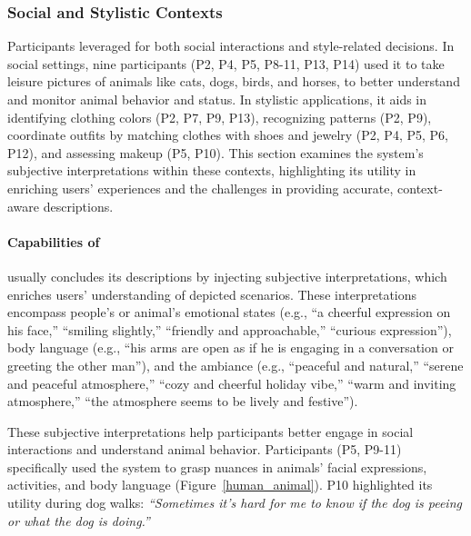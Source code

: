 \subsubsection{Social and Stylistic Contexts}
\label{social_stylistic}


Participants leveraged \sbma{} for both social interactions and style-related decisions. 
In social settings, nine participants (P2, P4, P5, P8-11, P13, P14) used it to take leisure pictures of animals like cats, dogs, birds, and horses, to better understand and monitor animal behavior and status. 
% 
In stylistic applications, it aids in identifying clothing colors (P2, P7, P9, P13), recognizing patterns (P2, P9), coordinate outfits by matching clothes with shoes and jewelry (P2, P4, P5, P6, P12), and assessing makeup (P5, P10).
% 
This section examines the system's subjective interpretations within these contexts, highlighting its utility in enriching users’ experiences and the challenges in providing accurate, context-aware descriptions.





\paragraph{Capabilities of \bma}

\sbma{} usually concludes its descriptions by injecting subjective interpretations, which enriches users' understanding of depicted scenarios. 
These interpretations encompass people's or animal's emotional states (e.g., ``a cheerful expression on his face,'' ``smiling slightly,'' ``friendly and approachable,'' ``curious expression''), 
body language (e.g., ``his arms are open as if he is engaging in a conversation or greeting the other man''),
and the ambiance (e.g., ``peaceful and natural,'' ``serene and peaceful atmosphere,'' ``cozy and cheerful holiday vibe,'' ``warm and inviting atmosphere,'' ``the atmosphere seems to be lively and festive''). 




These subjective interpretations help participants better engage in social interactions and understand animal behavior. 
% 
Participants (P5, P9-11) specifically used the system to grasp nuances in animals' facial expressions, activities, and body language (Figure~\ref{human_animal}). P10 highlighted its utility during dog walks: \textit{``Sometimes it's hard for me to know if the dog is peeing or what the dog is doing.''}

